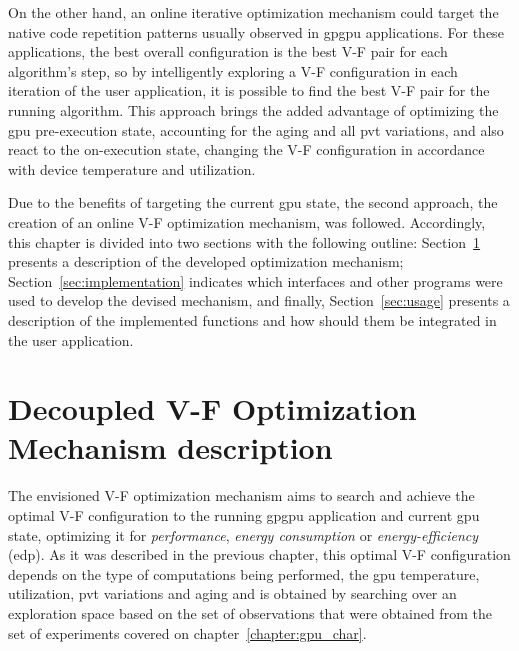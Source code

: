 On the other hand, an online iterative optimization mechanism could target the native code repetition patterns usually observed in \acrshort{gpgpu} applications. For these applications, the best overall configuration is the best V-F pair for each algorithm's step, so by intelligently exploring a V-F configuration in each iteration of the user application, it is possible to find the best V-F pair for the running algorithm.
This approach brings the added advantage of optimizing the \acrshort{gpu} pre-execution state, accounting for the aging and all \acrshort{pvt} variations, and also react to the on-execution state, changing the V-F configuration in accordance with device temperature and utilization.



Due to the benefits of targeting the current \acrshort{gpu} state, the second approach, the creation of an online V-F optimization mechanism, was followed. 
Accordingly, this chapter is divided into two sections with the following outline: Section~\ref{section:opt} presents a description of the developed optimization mechanism; Section~\ref{sec:implementation} indicates which interfaces  and other programs were used to develop the devised mechanism, and finally, Section~\ref{sec:usage} presents a description of the implemented functions and how should them be integrated in the user application.



\section{Decoupled V-F Optimization Mechanism description}
\label{section:opt}


The envisioned V-F optimization mechanism aims to search and achieve the optimal V-F configuration to the running \acrshort{gpgpu} application and current \acrshort{gpu} state, optimizing it for \textit{performance}, \textit{energy consumption} or \textit{energy-efficiency} (\acrshort{edp}). As it was described in the previous chapter, this optimal V-F configuration depends on the type of computations being performed, the \acrshort{gpu} temperature, utilization, \acrshort{pvt} variations and aging and is obtained by searching over an exploration space based on the set of observations that were obtained from the set of experiments covered on chapter~\ref{chapter:gpu_char}. 

